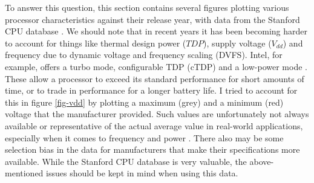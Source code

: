 \documentclass[12pt,a4paper]{article} %
\begin{document}
To answer this question, this section contains several figures plotting various processor characteristics against their release year, with data from the Stanford CPU database \cite{cpudb}. We should note that in recent years it has been becoming harder to account for things like thermal design power ($TDP$), supply voltage ($V_{dd}$) and frequency due to dynamic voltage and frequency scaling (DVFS). Intel, for example, offers a turbo mode, configurable TDP (cTDP) and a low-power mode \cite[p.~87-94]{intelDataSheet}. These allow a processor to exceed its standard performance for short amounts of time, or to trade in performance for a longer battery life. I tried to account for this in figure \ref{fig-vdd} by plotting a maximum (grey) and a minimum (red) voltage that the manufacturer provided. Such values are unfortunately not always available or representative of the actual average value in real-world applications, especially when it comes to frequency and power \cite{caseAgainstACP}. There also may be some selection bias in the data for manufacturers that make their specifications more available. While the Stanford CPU database is very valuable, the above-mentioned issues should be kept in mind when using this data. \\
\end{document}
